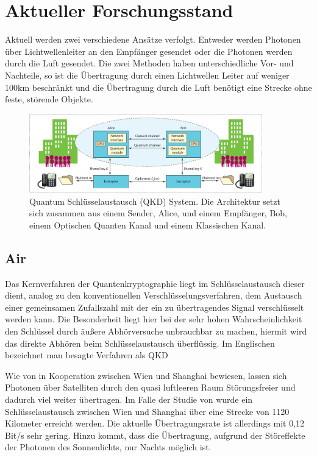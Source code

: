 \chapter{Aktueller Forschungsstand}

Aktuell werden zwei verschiedene Ansätze verfolgt.
Entweder werden Photonen über Lichtwellenleiter an den Empfänger gesendet oder die Photonen werden durch die Luft gesendet.
Die zwei Methoden haben unterschiedliche Vor- und Nachteile, so ist die Übertragung durch einen Lichtwellen Leiter auf weniger 100km beschränkt und die Übertragung durch die Luft benötigt eine Strecke ohne feste, störende Objekte.

\begin{figure}[htbp] 
  \centering
     \includegraphics[width=0.9\textwidth]{img/qkd.jpg}
     \caption{Quantum Schlüsselaustausch (QKD) System. Die Architektur setzt sich zusammen aus einem Sender, Alice, und einem Empfänger, Bob, einem Optischen Quanten Kanal und einem Klassischen Kanal.}
  \label{fig:Bild1}
\end{figure}
\section{Air}
Das Kernverfahren der Quantenkryptographie liegt im Schlüsselaustausch
dieser dient, analog zu den konventionellen Verschlüsselungsverfahren, dem Austausch einer gemeinsamen Zufallszahl mit der ein zu übertragendes Signal verschlüsselt werden kann. Die Besonderheit liegt hier bei der sehr hohen Wahrscheinlichkeit den Schlüssel durch äußere Abhörversuche unbrauchbar zu machen, hiermit wird das direkte Abhören beim Schlüsselaustausch überflüssig. Im Englischen bezeichnet man besagte Verfahren als \ac{QKD}

Wie von \cite{Ren_2017} in Kooperation zwischen Wien und Shanghai bewiesen, lassen sich Photonen über Satelliten durch den quasi luftleeren Raum Störungsfreier und dadurch viel weiter übertragen. Im Falle der Studie von \cite{Ren_2017} wurde ein Schlüsselaustausch zwischen Wien und Shanghai über eine Strecke von 1120 Kilometer erreicht werden. Die aktuelle Übertragungsrate ist allerdings mit 0,12 Bit/s sehr gering. Hinzu kommt, dass die Übertragung, aufgrund der Störeffekte der Photonen des Sonnenlichts, nur Nachts möglich ist.

